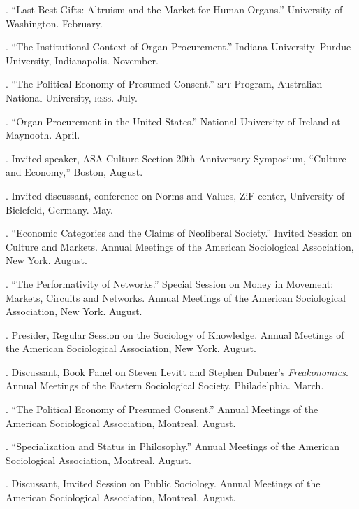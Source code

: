 \documentclass[11pt]{article}
\begin{document}
. ``Last Best Gifts: Altruism and the Market for Human 
Organs.'' University of Washington. February. 

. ``The Institutional Context of Organ Procurement.'' Indiana
University--Purdue University, Indianapolis. November.

. ``The Political Economy of Presumed Consent.'' \textsc{spt} Program,
Australian National University, \textsc{rsss}. July. 

. ``Organ Procurement in the United States.'' National University of
Ireland at Maynooth. April. 



\bigskip


\medskip

. Invited speaker, ASA Culture Section 20th Anniversary Symposium, ``Culture and Economy,'' Boston, August.

. Invited discussant, conference on Norms and Values, ZiF center, University of Bielefeld, Germany. May. 

. ``Economic Categories and the Claims of Neoliberal Society.'' Invited Session on Culture and Markets. Annual Meetings of the American Sociological Association, New York. August.

. ``The Performativity of Networks.'' Special Session on Money in Movement: Markets, Circuits and Networks. Annual Meetings of the American Sociological Association, New York. August.

. Presider, Regular Session on the Sociology of Knowledge. Annual Meetings of the American Sociological Association, New York. August.

. Discussant, Book Panel on Steven Levitt and Stephen Dubner's \emph{Freakonomics}. Annual Meetings of the Eastern Sociological Society, Philadelphia. March.

. ``The Political Economy of Presumed Consent.'' Annual Meetings of the American Sociological Association, Montreal. August.

. ``Specialization and Status in Philosophy.'' Annual Meetings of the American Sociological Association, Montreal. August.

. Discussant, Invited Session on Public Sociology. Annual Meetings of the American Sociological Association, Montreal. August.
\end{document}
